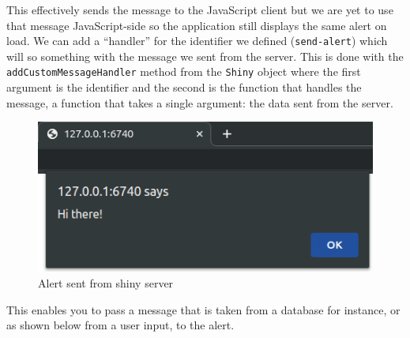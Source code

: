 \documentclass[
]{krantz}
\makeatletter
\newenvironment{Shaded}{\begin{snugshade}}{\end{snugshade}}
\newcommand{\CommentTok}[1]{\textcolor[rgb]{0.37,0.37,0.37}{\textit{#1}}}
\newcommand{\ControlFlowTok}[1]{\textcolor[rgb]{0.27,0.27,0.27}{\textbf{#1}}}
\newcommand{\DataTypeTok}[1]{\textcolor[rgb]{0.27,0.27,0.27}{#1}}
\newcommand{\KeywordTok}[1]{\textcolor[rgb]{0.27,0.27,0.27}{\textbf{#1}}}
\newcommand{\NormalTok}[1]{#1}
\newcommand{\OperatorTok}[1]{\textcolor[rgb]{0.43,0.43,0.43}{\textbf{#1}}}
\newcommand{\StringTok}[1]{\textcolor[rgb]{0.5,0.5,0.5}{#1}}
\newenvironment{kframe}{%
\medskip{}
\setlength{\fboxsep}{.8em}
 \def\at@end@of@kframe{}%
 \ifinner\ifhmode%
  \def\at@end@of@kframe{\end{minipage}}%
  \begin{minipage}{\columnwidth}%
 \fi\fi%
 \def\FrameCommand##1{\hskip\@totalleftmargin \hskip-\fboxsep
 \colorbox{shadecolor}{##1}\hskip-\fboxsep
     \hskip-\linewidth \hskip-\@totalleftmargin \hskip\columnwidth}%
 \MakeFramed {\advance\hsize-\width
   \@totalleftmargin\z@ \linewidth\hsize
   \@setminipage}}%
 {\par\unskip\endMakeFramed%
 \at@end@of@kframe}
\renewenvironment{Shaded}{\begin{kframe}}{\end{kframe}}
\makeatother
\begin{document}
\begin{Shaded}
\end{Shaded}

This effectively sends the message to the JavaScript client but we are yet to use that message JavaScript-side so the application still displays the same alert on load. We can add a ``handler'' for the identifier we defined (\texttt{send-alert}) which will so something with the message we sent from the server. This is done with the \texttt{addCustomMessageHandler} method from the \texttt{Shiny} object where the first argument is the identifier and the second is the function that handles the message, a function that takes a single argument: the data sent from the server.

\begin{Shaded}
\end{Shaded}

\begin{figure}
\centering
\includegraphics{images/alert-shiny.png}
\caption{Alert sent from shiny server}
\end{figure}

This enables you to pass a message that is taken from a database for instance, or as shown below from a user input, to the alert.
\end{document}

